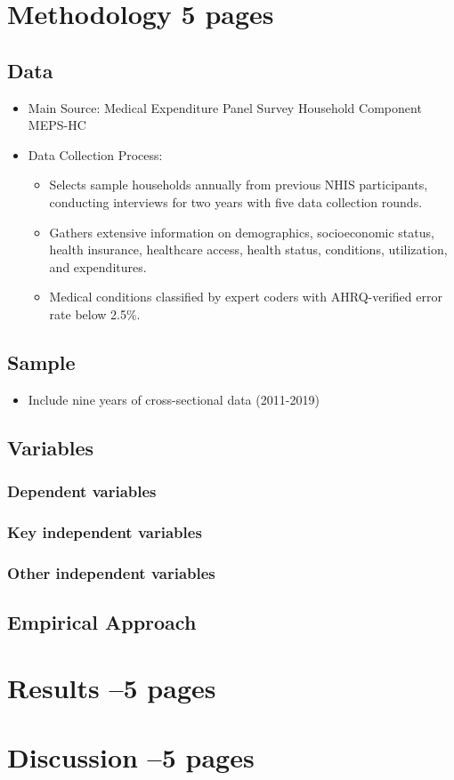 \documentclass[10pt, oneside]{article}
\begin{document}
\section{Methodology 5 pages}

\subsection{Data}
\begin{itemize}

\item Main Source: Medical Expenditure Panel Survey Household Component MEPS-HC
\item Data Collection Process: 
\begin{itemize}
    \item Selects sample households annually from previous NHIS participants, conducting interviews for two years with five data collection rounds.
    \item Gathers extensive information on demographics, socioeconomic status, health insurance, healthcare access, health status, conditions, utilization, and expenditures.
    \item Medical conditions classified by expert coders with AHRQ-verified error rate below 2.5\%.
\end{itemize}
\end{itemize}

\subsection{Sample}

\begin{itemize}
    \item Include nine years of cross-sectional data (2011-2019)
\end{itemize}

\subsection{Variables}


\subsubsection{Dependent variables}
\subsubsection{Key independent variables}
\subsubsection{Other independent variables}
\subsection{Empirical Approach}

\section{Results --5 pages}

\section{Discussion --5 pages}
\end{document}

